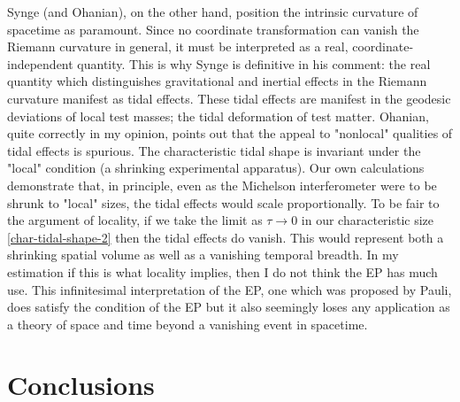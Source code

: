 \documentclass[11pt]{article}
\begin{document}
Synge (and Ohanian), on the other hand, position the intrinsic curvature of spacetime as paramount. Since no coordinate transformation can vanish the Riemann curvature in general, it must be interpreted as a real, coordinate-independent quantity. This is why Synge is definitive in his comment: the real quantity which distinguishes gravitational and inertial effects in the Riemann curvature manifest as tidal effects. These tidal effects are manifest in the geodesic deviations of local test masses; the tidal deformation of test matter. Ohanian, quite correctly in my opinion, points out that the appeal to "nonlocal" qualities of tidal effects is spurious. The characteristic tidal shape is invariant under the "local" condition (a shrinking experimental apparatus). Our own calculations demonstrate that, in principle, even as the Michelson interferometer were to be shrunk to "local" sizes, the tidal effects would scale proportionally. To be fair to the argument of locality, if we take the limit as $\tau \rightarrow 0$ in our characteristic size \eqref{char-tidal-shape-2} then the tidal effects do vanish. This would represent both a shrinking spatial volume as well as a vanishing temporal breadth. In my estimation if this is what locality implies, then I do not think the EP has much use. This infinitesimal interpretation of the EP, one which was proposed by Pauli, does satisfy the condition of the EP but it also seemingly loses any application as a theory of space and time beyond a vanishing event in spacetime.

\section{Conclusions}
\end{document}
